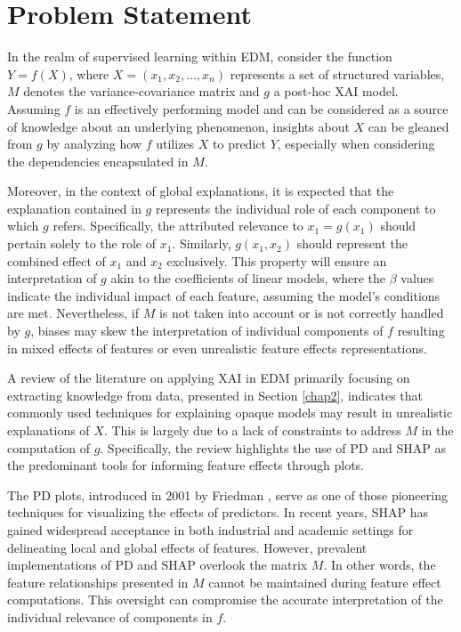 \section{Problem Statement}

In the realm of supervised learning within \gls{EDM}, consider the function \( Y = f(X) \), where \( X = (x_1, x_2, \ldots, x_n) \) represents a set of structured variables, \( M \) denotes the variance-covariance matrix and \(g\) a post-hoc \gls{XAI} model. Assuming \( f \) is an effectively performing model and can be considered as a source of knowledge about an underlying phenomenon, insights about \( X \) can be gleaned from \(g\) by analyzing how \( f \) utilizes \( X \) to predict \( Y \), especially when considering the dependencies encapsulated in \( M \).

Moreover, in the context of global explanations, it is expected that the explanation contained in \(g\) represents the individual role of each component to which \(g\) refers. Specifically, the attributed relevance to \(x_1 = g(x_1)\) should pertain solely to the role of \(x_1\). Similarly, \(g(x_1, x_2)\) should represent the combined effect of \(x_1\) and \(x_2\) exclusively. This property will ensure an interpretation of \(g\) akin to the coefficients of linear models, where the \(\beta\) values indicate the individual impact of each feature, assuming the model's conditions are met. Nevertheless, if \(M\) is not taken into account or is not correctly handled by \(g\), biases may skew the interpretation of individual components of \(f\) resulting in mixed effects of features or even unrealistic feature effects representations.

A review of the literature on applying \gls{XAI} in \gls{EDM} primarily focusing on extracting knowledge from data,  presented in Section \ref{chap2}, indicates that commonly used techniques for explaining opaque models may result in unrealistic explanations of \(X\). This is largely due to a lack of constraints to address \(M\) in the computation of \(g\). Specifically, the review highlights the use of \gls{PD} and \gls{SHAP} as the predominant tools for informing feature effects through plots.

The \gls{PD} plots, introduced in 2001 by Friedman \cite{Friedman2001GreedyMachine.}, serve as one of those pioneering techniques for visualizing the effects of predictors. In recent years, \gls{SHAP} \cite{10.5555/3295222.3295230} has gained widespread acceptance in both industrial and academic settings \cite{Bhatt2020ExplainableDeployment} for delineating local and global effects of features. However, prevalent implementations of \gls{PD} and \gls{SHAP} overlook the matrix \(M\). In other words, the feature relationships presented in \(M\) cannot be maintained during feature effect computations. This oversight can compromise the accurate interpretation of the individual relevance of components in \(f\). 

